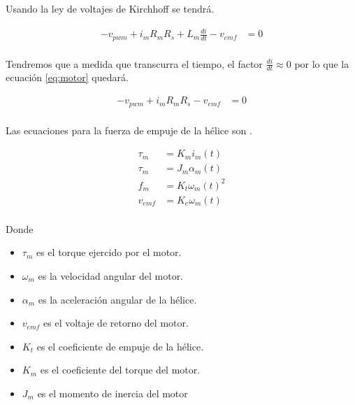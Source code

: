 \documentclass[a4paper]{IEEEtran} %
\begin{document}
Usando la ley de voltajes de Kirchhoff se tendrá.

\begin{equation}
    \begin{split}
        -v_{pwm}+i_{m}R_{m}R_{s}+L_{m}\frac{di}{dt}-v_{emf}&=0\\
    \end{split}
    \label{eq:motor}
\end{equation}

Tendremos que a medida que transcurra el tiempo, el factor $\frac{di}{dt}\approx0$ por lo que la ecuación \ref{eq:motor} quedará.

\begin{equation}
    \begin{split}
        -v_{pwm}+i_{m}R_{m}R_{s}-v_{emf}&=0\\
    \end{split}
    \label{eq:motor1}
\end{equation}

Las ecuaciones para la fuerza de empuje de la hélice son \cite{edxpage1}.

\begin{equation}
    \begin{split}
        \tau_{m}&=K_{m}i_{m}(t)\\
        \tau_{m}&=J_{m}\alpha_{m}(t)\\
        f_{m}&=K_{t}\omega_{m}(t)^2\\
        v_{emf}&=K_{e}\omega_{m}(t)\\
    \end{split}
    \label{eq:helix}
\end{equation}

Donde 
\begin{itemize}
    \item $\tau_{m}$ es el torque ejercido por el motor.
    \item $\omega_{m}$ es la velocidad angular del motor.
    \item $\alpha_{m}$ es la aceleración angular de la hélice.
    \item $v_{emf}$ es el voltaje de retorno del motor.
    \item $K_{t}$ es el coeficiente de empuje de la hélice.
    \item $K_{m}$ es el coeficiente del torque del motor.
    \item $J_{m}$ es el momento de inercia del motor
\end{itemize}
\end{document}

